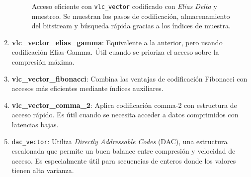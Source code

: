 \begin{enumerate}
        \begin{figure}[h!]
            \centering
            \caption[Ejemplo \texttt{vlc\_vector\_elias\_delta}]{Acceso eficiente con \texttt{vlc\_vector} codificado con \textit{Elias Delta} y muestreo. Se muestran los pasos de codificación, almacenamiento del bitstream y búsqueda rápida gracias a los índices de muestra.}
            \label{vlc_vector_elias_delta}
        \end{figure}
        
            
    

    \item \textbf{vlc\_vector\_elias\_gamma}:
    Equivalente a la anterior, pero usando codificación Elias-Gamma. Útil cuando se prioriza el acceso sobre la compresión máxima.

    \item \textbf{vlc\_vector\_fibonacci}:
    Combina las ventajas de codificación Fibonacci con accesos más eficientes mediante índices auxiliares.

    \item \textbf{vlc\_vector\_comma\_2}:
    Aplica codificación comma-2 con estructura de acceso rápido. Es útil cuando se necesita acceder a datos comprimidos con latencias bajas.

    \item \texttt{dac\_vector}:
        Utiliza \textit{Directly Addressable Codes} (DAC), una estructura escalonada que permite un buen balance entre compresión y velocidad de acceso. Es especialmente útil para secuencias de enteros donde los valores tienen alta varianza.
        

\end{enumerate}
